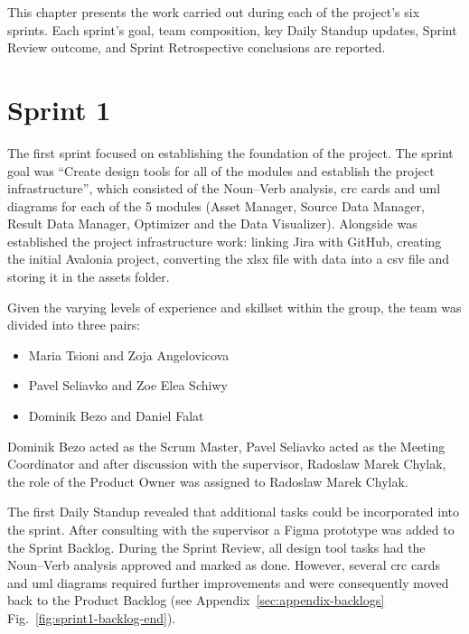 
\noindent
This chapter presents the work carried out during each of the project's
six sprints. Each sprint's goal, team composition, key Daily Standup updates,
Sprint Review outcome, and Sprint Retrospective conclusions are reported.

\section{Sprint 1}
\label{sec:sprint1}

The first sprint focused on establishing the foundation of the project. The
sprint goal was \enquote{Create design tools for all of the modules and
establish the project infrastructure}, which consisted of the Noun--Verb
analysis, \acrshort{crc} cards and \acrshort{uml} diagrams for each of the 5 modules (Asset
Manager, Source Data Manager, Result Data Manager, Optimizer and the
Data Visualizer). Alongside was established the project infrastructure
work: linking Jira with GitHub, creating the initial Avalonia project,
converting the \acrshort{xlsx} file with data into a \acrshort{csv} file and storing it in the
assets folder.

Given the varying levels of experience and skillset within the group, the team was divided
into three pairs:
\begin{itemize}
    \item Maria Tsioni and Zoja Angelovicova
    \item Pavel Seliavko and Zoe Elea Schiwy
    \item Dominik Bezo and Daniel Falat
\end{itemize}

Dominik Bezo acted as the Scrum Master, Pavel Seliavko acted as the
Meeting Coordinator and after discussion with the supervisor, Radoslaw
Marek Chylak, the role of the Product Owner was assigned to Radoslaw
Marek Chylak.

The first Daily Standup revealed that additional tasks could be incorporated into the sprint.
After consulting with the supervisor a Figma prototype was added to the Sprint Backlog.
During the Sprint Review, all design tool tasks had the Noun--Verb analysis approved and
marked as done. However, several \acrshort{crc} cards and \acrshort{uml} diagrams required further
improvements and were consequently moved back to the Product Backlog (see Appendix~\ref{sec:appendix-backlogs} Fig.~\ref{fig:sprint1-backlog-end}).

